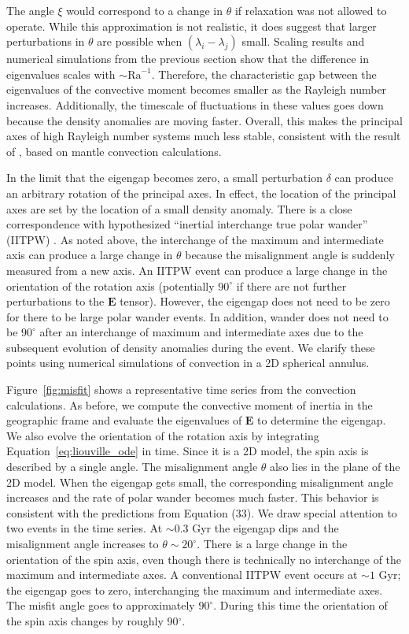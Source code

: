 \documentclass[preprint,12pt,authoryear]{elsarticle}
\begin{document}
The angle $\xi$ would correspond to a change in $\theta$ if relaxation was not allowed to operate. While this approximation is not realistic, it does suggest that larger perturbations in $\theta$ are possible when  $(\lambda_i-\lambda_j)$ small. Scaling results and numerical simulations from the previous section show that the difference in eigenvalues scales with $\sim \mathrm{Ra}^{-1}$.
Therefore, the characteristic gap between the eigenvalues of the convective moment becomes smaller as the Rayleigh number increases.
Additionally, the timescale of fluctuations in these values goes down because the density anomalies are moving faster.
Overall, this makes the principal axes of high Rayleigh number systems much less stable, consistent with the result of \citet{richards1999polar}, based on mantle convection calculations.

In the limit that the eigengap becomes zero, a small perturbation $\delta$ can produce an arbitrary rotation of the principal axes. In effect, the location of the principal axes are set by the location of a small density anomaly. There is a close correspondence with  hypothesized ``inertial interchange true polar wander'' (IITPW) \citep{kirschvink1997evidence}. As noted above, the interchange of the maximum and intermediate axis can produce a large change in $\theta$ because the misalignment angle is suddenly measured from a new axis. An IITPW event can produce a large change in the orientation of the rotation axis (potentially $90^{\circ}$ if there are not further perturbations to the $\mathbf{E}$ tensor).  However, the eigengap does not need to be zero for there to be large polar wander events. In addition, wander does not need to be $90^\circ$ after an interchange of maximum and intermediate axes due to the subsequent evolution of density anomalies during the event.  We clarify these points using numerical simulations of convection in a 2D spherical annulus.

Figure~\ref{fig:misfit} shows a representative time series from the convection calculations. As before, we compute the convective moment of inertia in the geographic frame and evaluate the eigenvalues of $\mathbf{E}$ to determine the eigengap. We also evolve the orientation of the rotation axis by integrating  Equation~\eqref{eq:liouville_ode} in time.
Since it is a 2D model, the spin axis is described by a single angle. The misalignment angle $\theta$ also lies in the plane of the 2D model.
When the eigengap gets small,  the corresponding misalignment angle increases and the rate of polar wander becomes much faster. This behavior is consistent with the predictions from Equation (33). We draw special attention to two events in the time series. At $\sim$0.3 Gyr the eigengap dips and the misalignment angle increases to $\theta \sim 20^{\circ}$. There is a large change in the orientation of the spin axis, even though
there is technically no interchange of the maximum and intermediate axes. A conventional IITPW event occurs at $\sim 1$ Gyr;  the eigengap goes to zero, interchanging the maximum and intermediate axes. The misfit angle goes to approximately $90^\circ$. During this time the orientation of the spin axis changes by roughly 90$^{\circ}$. 
\end{document}
